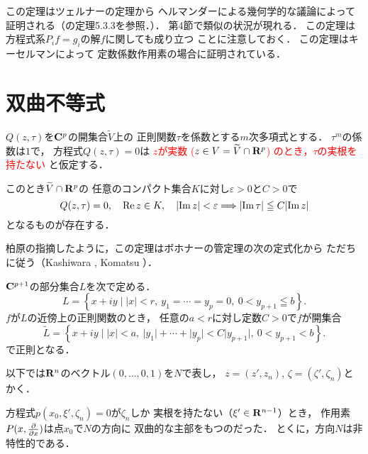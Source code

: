 \begin{RMK*}
    この定理はツェルナー\cite{15}の定理から
    ヘルマンダーによる幾何学的な議論によって
    証明される（\cite{5}の定理5.3.3を参照．）．
    第4節で類似の状況が現れる．
    この定理は方程式系\(P_if=g_i\)の解\(f\)に関しても成り立つ
    ことに注意しておく．
    この定理はキーセルマン\cite{8}によって
    定数係数作用素の場合に証明されている．
\end{RMK*}

\section{双曲不等式}

\begin{THM}\label{thm21}
    \(Q(z,\tau)\)を\(\mathbf{C}^p\)の開集合\(\widetilde{V}\)上の
    正則関数\(\tau\)を係数とする\(m\)次多項式とする．
    \(\tau^m\)の係数は\(1\)で，
    方程式\(Q(z,\tau)=0\)は
    \textcolor{red}{
        \(z\)が実数 (\(
            z\in V=\widetilde{V}\cap \mathbf{R}^p
        \)) のとき，\(\tau\)の実根を持たない    
    }と仮定する．

    このとき\(\widetilde{V}\cap \mathbf{R}^p\)の
    任意のコンパクト集合\(K\)に対し\(\varepsilon>0\)と\(C>0\)で\[
        Q(z,\tau)=0,\quad \mathop{\mathrm{Re}}\nolimits{z}\in K,
        \quad
        \lvert\mathop{\mathrm{Im}}\nolimits{z}\rvert<\varepsilon
        \Longrightarrow
        \lvert\mathop{\mathrm{Im}}\nolimits{\tau}\rvert\leqq C\lvert\mathop{\mathrm{Im}}\nolimits{z}\rvert
    \]
    となるものが存在する．
\end{THM}

柏原の指摘したように，この定理はボホナーの管定理の次の定式化から
ただちに従う（Kashiwara \cite{6}, Komatsu \cite{8bis}）．

\begin{THM}\label{thm22}
    \(\mathbf{C}^{p+1}\)の部分集合\(L\)を次で定める．
    \[
        L=\left\{
            x+iy\mid
            \lvert{x}\rvert<r,\ 
            y_1=\cdots=y_p=0,\ 
            0<y_{p+1}\leqq b
        \right\}.
    \]
    \(f\)が\(L\)の近傍上の正則関数のとき，
    任意の\(a<r\)に対し定数\(C>0\)で\(f\)が開集合
    \[
        \widetilde{L}=\left\{
            x+iy\mid
            \lvert{x}\rvert<a,\ 
            \lvert{y_1}\rvert+\cdots+\lvert{y_p}\rvert<C\lvert{y_{p+1}}\rvert,\ 
            0<y_{p+1}< b
        \right\}.
    \]
    で正則となる．
\end{THM}

以下では\(\mathbf{R}^n\)のベクトル\((0,\dots,0,1)\)を\(N\)で表し，
\(z=(z',z_n)\), \(\zeta=(\zeta',\zeta_n)\)とかく．

方程式\(p(x_0,\xi',\zeta_n)=0\)が\(\zeta_n\)しか
実根を持たない（\(\xi'\in\mathbf{R}^{n-1}\)）とき，
作用素\(P(x,\frac{\partial}{\partial x})\)は点\(x_0\)で\(N\)の方向に
双曲的な主部をもつのだった．
とくに，方向\(N\)は非特性的である．

